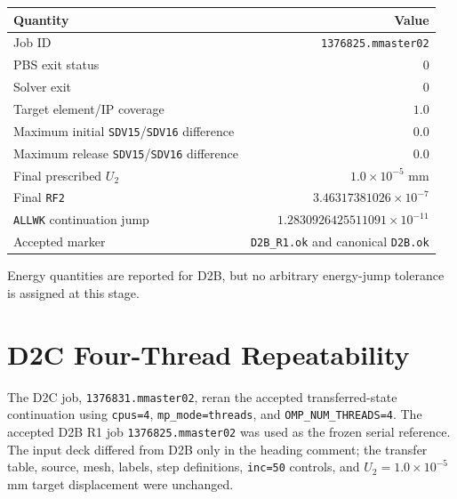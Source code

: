 \documentclass[11pt,a4paper]{article}
\begin{document}
\begin{table}[h]
\centering
\begin{tabular}{@{}lr@{}}
\toprule
Quantity & Value \\
\midrule
Job ID & \texttt{1376825.mmaster02} \\
PBS exit status & $0$ \\
Solver exit & $0$ \\
Target element/IP coverage & $1.0$ \\
Maximum initial \texttt{SDV15}/\texttt{SDV16} difference & $0.0$ \\
Maximum release \texttt{SDV15}/\texttt{SDV16} difference & $0.0$ \\
Final prescribed $U_2$ & $1.0\times10^{-5}$ mm \\
Final \texttt{RF2} & $3.46317381026\times10^{-7}$ \\
\texttt{ALLWK} continuation jump & $1.2830926425511091\times10^{-11}$ \\
Accepted marker & \texttt{D2B\_R1.ok} and canonical \texttt{D2B.ok} \\
\bottomrule
\end{tabular}
\end{table}

Energy quantities are reported for D2B, but no arbitrary energy-jump tolerance
is assigned at this stage.

\section{D2C Four-Thread Repeatability}
The D2C job, \texttt{1376831.mmaster02}, reran the accepted transferred-state
continuation using \texttt{cpus=4}, \texttt{mp\_mode=threads}, and
\texttt{OMP\_NUM\_THREADS=4}. The accepted D2B R1 job
\texttt{1376825.mmaster02} was used as the frozen serial reference. The input
deck differed from D2B only in the heading comment; the transfer table, source,
mesh, labels, step definitions, \texttt{inc=50} controls, and
$U_2=1.0\times10^{-5}$ mm target displacement were unchanged.
\end{document}
